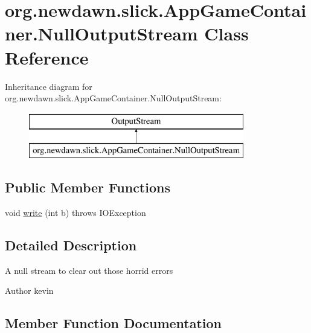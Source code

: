 \hypertarget{classorg_1_1newdawn_1_1slick_1_1_app_game_container_1_1_null_output_stream}{}\section{org.\+newdawn.\+slick.\+App\+Game\+Container.\+Null\+Output\+Stream Class Reference}
\label{classorg_1_1newdawn_1_1slick_1_1_app_game_container_1_1_null_output_stream}
Inheritance diagram for org.\+newdawn.\+slick.\+App\+Game\+Container.\+Null\+Output\+Stream\+:\begin{figure}[H]
\begin{center}
\leavevmode
\includegraphics[height=2.000000cm]{classorg_1_1newdawn_1_1slick_1_1_app_game_container_1_1_null_output_stream}
\end{center}
\end{figure}
\subsection*{Public Member Functions}
\begin{DoxyCompactItemize}
\item 
void \mbox{\hyperlink{classorg_1_1newdawn_1_1slick_1_1_app_game_container_1_1_null_output_stream_a9ac16227b96a2a491d1e5b405372961d}{write}} (int b)  throws I\+O\+Exception 
\end{DoxyCompactItemize}


\subsection{Detailed Description}
A null stream to clear out those horrid errors

\begin{DoxyAuthor}{Author}
kevin 
\end{DoxyAuthor}


\subsection{Member Function Documentation}
\mbox{\label{classorg_1_1newdawn_1_1slick_1_1_app_game_container_1_1_null_output_stream_a9ac16227b96a2a491d1e5b405372961d}} 
